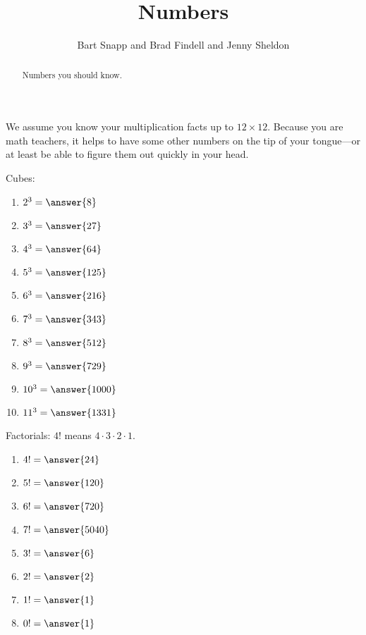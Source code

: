 \documentclass[nooutcomes]{ximera}
\title{Numbers}
\author{Bart Snapp and Brad Findell and Jenny Sheldon}
\begin{document}
\begin{abstract}
Numbers you should know. 
\end{abstract}
\maketitle




We assume you know your multiplication facts up to $12\times 12$. Because you are math teachers, it helps to have some other numbers on the tip of your tongue---or at least be able to figure them out quickly in your head. 


\begin{problem}
Cubes:
\begin{enumerate}
\item $2^3 = \answer{8}$
\item $3^3 = \answer{27}$
\item $4^3 = \answer{64}$
\item $5^3 = \answer{125}$
\item $6^3 = \answer{216}$
\item $7^3 = \answer{343}$
\item $8^3 = \answer{512}$
\item $9^3 = \answer{729}$
\item $10^3 = \answer{1000}$
\item $11^3 = \answer{1331}$
\end{enumerate}
\end{problem}

\begin{problem}
Factorials: $4!$ means $4\cdot3\cdot2\cdot1$.  
\begin{enumerate}
\item $4!= \answer{24}$
\item $5!= \answer{120}$
\item $6!= \answer{720}$
\item $7!= \answer{5040}$
\item $3!= \answer{6}$
\item $2!= \answer{2}$
\item $1!= \answer{1}$
\item $0!= \answer{1}$
\end{enumerate}
\end{problem}
\end{document}
